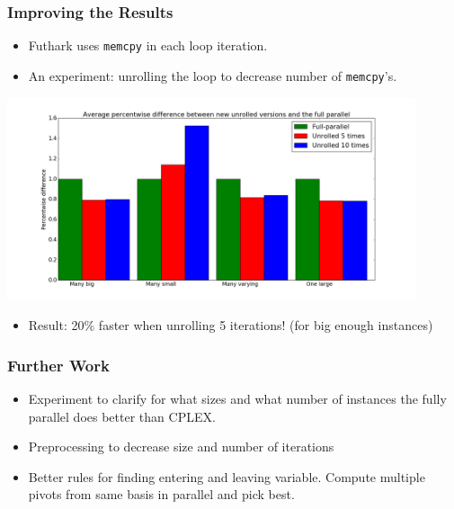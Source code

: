 \documentclass{beamer}
\renewcommand{\emph}[1]{\textcolor{structure}{#1}}
\begin{document}
\begin{frame}[fragile]
\frametitle{Improving the Results}

\begin{itemize}
\item Futhark uses \texttt{memcpy} in each loop iteration.

\item \emph{An experiment}: unrolling the loop to decrease number of \texttt{memcpy}'s.
\end{itemize}
\pause
\centering
\includegraphics[width=0.9\textwidth]{../Doc/figures/unrolling}

\begin{itemize}
\item \emph{Result}: 20\% faster when unrolling 5 iterations! {\tiny(for big enough instances)}
\end{itemize}
\end{frame}



\begin{frame}
\frametitle{Further Work}
\begin{itemize}
	\item Experiment to clarify for what sizes and what number of instances the fully parallel does better than CPLEX.
	\item Preprocessing to decrease size and number of iterations
	\item Better rules for finding entering and leaving variable. Compute multiple pivots from same basis in parallel and pick best.
\end{itemize}
\end{frame}
\end{document}

